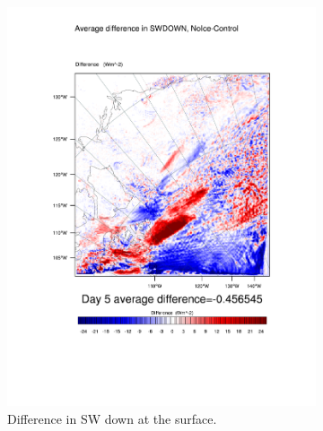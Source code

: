 \begin{figure}
\centering
	\begin{subfigure}{0.48\textwidth}
		\includegraphics[width=\textwidth]{results/noice/diff_NoIce_SWDOWN_Day5.pdf}
		\caption{Difference in SW down at the surface.}
		\label{subfig:swdown_r2Day5}
	\end{subfigure}
	\quad
	\begin{subfigure}{0.48\textwidth}
		\centering

\end{subfigure}
\end{figure}
